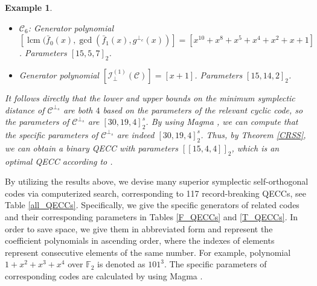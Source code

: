 \documentclass[journal]{IEEEtran}
\newtheorem{example}{Example}
\newtheorem{remark}{Remark}
\begin{document}
\begin{example}
\begin{itemize}
      \item  $\mathscr{C}_6$: Generator polynomial $\left[\operatorname{lcm}(\bar{f}_0(x),\gcd(\bar{f}_1(x),g^{\perp_{e}}(x))\right]=\left[x^{10} + x^8 + x^5 + x^4 + x^2 + x + 1\right]$. Parameters $\left[15,5,7\right]_2$.
      \item  Generator polynomial $\left[\mathcal{I}^{(1)}_{\perp}(\mathscr{C})\right]= \left[x + 1\right]$. Parameters $\left[15,14,2\right]_2$.
 \end{itemize}

 
 It follows directly that the lower and upper bounds on the minimum symplectic distance of $\mathscr{C}^{\perp_s}$ are both $4$ based on the parameters of the relevant cyclic code, so the parameters of $\mathscr{C}^{\perp_s}$ are $\left[30,19,4\right]_2^s$. By using Magma \cite{bosma1997magma}, we can compute that the specific parameters of $\mathscr{C}^{\perp_s}$ are indeed $\left[30,19,4\right]_2^s$.
Thus, by Theorem \ref{CRSS}, we can obtain a binary QECC with parameters $\left[\left[15,4,4\right]\right]_2$, which is an optimal QECC according to \cite{Grassltable}.
\end{example}




By utilizing the results above, we devise many superior symplectic self-orthogonal codes via computerized search, corresponding to 117 record-breaking QECCs, see Table \ref{all_QECCs}.
Specifically, we give the specific generators of related codes and their corresponding parameters in Tables \ref{F_QECCs} and \ref{T_QECCs}. 
In order to save space, we give them in abbreviated form and represent the coefficient polynomials in ascending order, where the indexes of elements represent consecutive elements of the same number. For example, polynomial $1 + x^2 + x^3 + x^4$ over $\mathbb{F}_2$ is denoted as $101^3$. The specific parameters of corresponding codes are calculated by using Magma \cite{bosma1997magma}.
\end{document}
